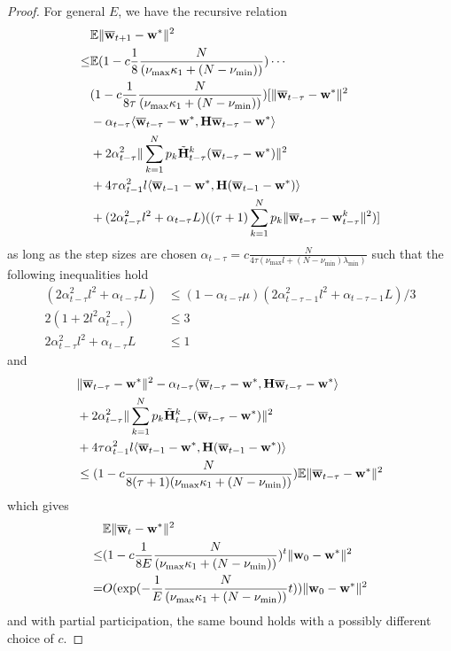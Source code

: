 \begin{proof}
	For general $E$, we have the recursive relation
	\begin{align*}
	& \mathbb{E}\|{\overline{\mathbf{w}}}_{t+1}-{\mathbf{w}}^{\ast}\|^{2} \\
	\leq& \mathbb{E}(1-c\frac{1}{8}\frac{N}{(\nu_{\max}\kappa_{1}+(N-\nu_{\min}))})\cdots \\
	&(1-c\frac{1}{8\tau}\frac{N}{(\nu_{\max}\kappa_{1}+(N-\nu_{\min}))})[\|{\overline{\mathbf{w}}}_{t-\tau}-{\mathbf{w}}^{\ast}\|^{2}\\
	& -\alpha_{t-\tau}\langle{\overline{\mathbf{w}}}_{t-\tau}-{\mathbf{w}}^{\ast},{\mathbf{H}}{\overline{\mathbf{w}}}_{t-\tau}-{\mathbf{w}}^{\ast}\rangle\\
	& +2\alpha_{t-\tau}^{2}\|\sum_{k=1}^{N}p_{k}\tilde{{\mathbf{H}}}_{t-\tau}^{k}({\overline{\mathbf{w}}}_{t-\tau}-{\mathbf{w}}^{\ast})\|^{2}\\
	& +4\tau\alpha_{t-1}^{2}l\langle{\overline{\mathbf{w}}}_{t-1}-{\mathbf{w}}^{\ast},{\mathbf{H}}({\overline{\mathbf{w}}}_{t-1}-{\mathbf{w}}^{\ast})\rangle\\
	& +(2\alpha_{t-\tau}^{2}l^{2}+\alpha_{t-\tau}L)((\tau+1)\sum_{k=1}^{N}p_{k}\|{\overline{\mathbf{w}}}_{t-\tau}-{\mathbf{w}}_{t-\tau}^{k}\|^{2})]
	\end{align*}
	as long as the step sizes are chosen $\alpha_{t-\tau}=c\frac{N}{4\tau(\nu_{\max}l+(N-\nu_{\min})\lambda_{\min})}$
	such that the following inequalities hold 
	\begin{align*}
	(2\alpha_{t-\tau}^{2}l^{2}+\alpha_{t-\tau}L) & \leq(1-\alpha_{t-\tau}\mu)(2\alpha_{t-\tau-1}^{2}l^{2}+\alpha_{t-\tau-1}L)/3\\
	2(1+2l^{2}\alpha_{t-\tau}^{2}) & \leq3\\
	2\alpha_{t-\tau}^{2}l^{2}+\alpha_{t-\tau}L & \leq1
	\end{align*}
	and 
	\begin{align*}
	& \|{\overline{\mathbf{w}}}_{t-\tau}-{\mathbf{w}}^{\ast}\|^{2}-\alpha_{t-\tau}\langle{\overline{\mathbf{w}}}_{t-\tau}-{\mathbf{w}}^{\ast},{\mathbf{H}}{\overline{\mathbf{w}}}_{t-\tau}-{\mathbf{w}}^{\ast}\rangle\\
	& +2\alpha_{t-\tau}^{2}\|\sum_{k=1}^{N}p_{k}\tilde{{\mathbf{H}}}_{t-\tau}^{k}({\overline{\mathbf{w}}}_{t-\tau}-{\mathbf{w}}^{\ast})\|^{2}\\
	&+4\tau\alpha_{t-1}^{2}l\langle{\overline{\mathbf{w}}}_{t-1}-{\mathbf{w}}^{\ast},{\mathbf{H}}({\overline{\mathbf{w}}}_{t-1}-{\mathbf{w}}^{\ast})\rangle\\
	& \leq(1-c\frac{N}{8(\tau+1)(\nu_{\max}\kappa_{1}+(N-\nu_{\min}))})\mathbb{E}\|{\overline{\mathbf{w}}}_{t-\tau}-{\mathbf{w}}^{\ast}\|^{2}
	\end{align*}
	which gives 
	\begin{align*}
	& \mathbb{E}\|{\overline{\mathbf{w}}}_{t}-{\mathbf{w}}^{\ast}\|^{2} \\
	\leq&(1-c\frac{1}{8E}\frac{N}{(\nu_{\max}\kappa_{1}+(N-\nu_{\min}))})^{t}\|{\mathbf{w}}_{0}-{\mathbf{w}}^{\ast}\|^{2}\\
	=&O(\exp(-\frac{1}{E}\frac{N}{(\nu_{\max}\kappa_{1}+(N-\nu_{\min}))}t))\|{\mathbf{w}}_{0}-{\mathbf{w}}^{\ast}\|^{2}
	\end{align*}
	and with partial participation, the same bound holds with a possibly
	different choice of $c$. 
\end{proof}
